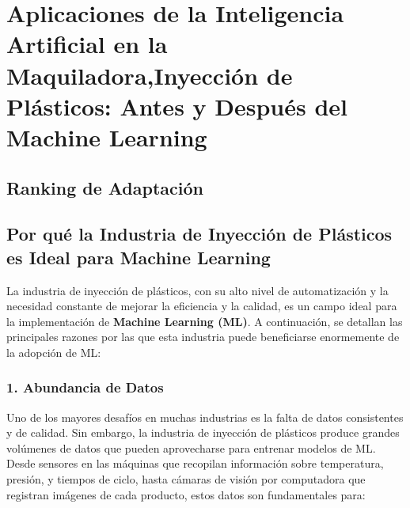 
\section{Aplicaciones de la Inteligencia Artificial en la Maquiladora,Inyección de Plásticos: Antes y Después del Machine Learning}

\subsection{Ranking de Adaptación}

\begin{table}[h!]
\centering
\caption{Ranking de Adaptación del Proyecto 1}
\end{table}
\subsection{Por qué la Industria de Inyección de Plásticos es Ideal para Machine Learning}

La industria de inyección de plásticos, con su alto nivel de automatización y la necesidad constante de mejorar la eficiencia y la calidad, es un campo ideal para la implementación de \textbf{Machine Learning (ML)}. A continuación, se detallan las principales razones por las que esta industria puede beneficiarse enormemente de la adopción de ML:

\subsubsection{1. Abundancia de Datos}

Uno de los mayores desafíos en muchas industrias es la falta de datos consistentes y de calidad. Sin embargo, la industria de inyección de plásticos produce grandes volúmenes de datos que pueden aprovecharse para entrenar modelos de ML. Desde sensores en las máquinas que recopilan información sobre temperatura, presión, y tiempos de ciclo, hasta cámaras de visión por computadora que registran imágenes de cada producto, estos datos son fundamentales para:

